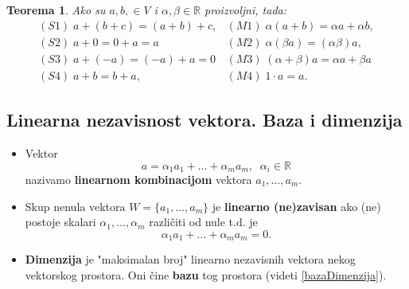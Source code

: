 \documentclass[a4paper,12pt,twoside]{report}
\newtheorem{theorem}{Teorema}[section]
\numberwithin{algorithm}{section}
\begin{document}
\begin{theorem}
    Ako su $a, b, \in V$ i $\alpha, \beta \in \mathbb{R}$ proizvoljni, tada:
    \begin{align*}
        &(S1)\;a+(b+c) = (a+b)+c, & (M1)\;\alpha(a + b) = \alpha a + \alpha b, \\
        &(S2)\;a + 0 = 0 + a = a &(M2)\;\alpha(\beta a) = (\alpha \beta)a,\;\;\;\;\;\;\;\\
        &(S3)\;a + (-a) = (-a) + a = 0 & (M3)\;(\alpha + \beta)a = \alpha a + \beta a\\
        &(S4)\;a + b = b + a, &(M4)\;1\cdot a = a.\;\;\;\;\;\;\;\;\;\;\;\;\;\;\;\;\;
    \end{align*}
\end{theorem}

\subsection{Linearna nezavisnost vektora. Baza i dimenzija}

\begin{itemize}
    \item Vektor \[ a = \alpha_1 a_1 + \dots + \alpha_m a_m, \;\; \alpha_i \in \mathbb{R}\] nazivamo \textbf{linearnom kombinacijom} vektora $a_1, \dots, a_m$.
    \begin{figure}[!h]
    \centering
\end{figure}
    \item Skup nenula vektora $W = \{a_1, \dots, a_m\}$ je \textbf{linearno (ne)zavisan} ako (ne) postoje skalari $\alpha_1, \dots, \alpha_m$ različiti od nule t.d. je 
    \[ \alpha_1 a_1 + \dots + \alpha_m a_m = 0. \]
    \item \textbf{Dimenzija} je "{maksimalan broj}" linearno nezavisnih vektora nekog vektorskog prostora. Oni čine \textbf{bazu} tog prostora (videti \ref{bazaDimenzija}).
\end{itemize}
\end{document}
